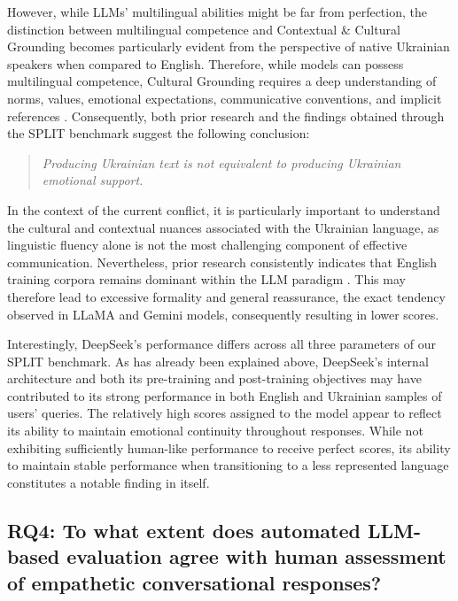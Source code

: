 \documentclass[10pt, twocolumn]{article}
\begin{document}
However, while LLMs' multilingual abilities might be far from perfection, the distinction between multilingual competence and Contextual \& Cultural Grounding becomes particularly evident from the perspective of native Ukrainian speakers when compared to English. Therefore, while models can possess multilingual competence, Cultural Grounding requires a deep understanding of norms, values, emotional expectations, communicative conventions, and implicit references \cite{rystrom2025multilingual}. Consequently, both prior research and the findings obtained through the SPLIT benchmark suggest the following conclusion:

\begin{quote}
    \centering
    \textit{Producing Ukrainian text is not equivalent to producing Ukrainian emotional support.}
\end{quote}

In the context of the current conflict, it is particularly important to understand the cultural and contextual nuances associated with the Ukrainian language, as linguistic fluency alone is not the most challenging component of effective communication. Nevertheless, prior research consistently indicates that English training corpora remains  dominant within the LLM paradigm \cite{grattafiori2024llama3herdmodels,
deepseekai2025deepseekv3technicalreport}. This  may therefore lead to excessive formality and general reassurance, the exact tendency observed in LLaMA and Gemini models, consequently resulting in lower scores.

Interestingly, DeepSeek's performance differs across all three parameters of our SPLIT benchmark. As has already been explained above, DeepSeek's internal architecture and both its pre-training and post-training objectives may have contributed to its strong performance in both English and Ukrainian samples of users' queries. The relatively high scores assigned to the model appear to reflect its ability to maintain emotional continuity throughout responses. While not exhibiting sufficiently human-like performance to receive perfect scores, its ability to maintain stable performance when transitioning to a less represented language constitutes a notable finding in itself.



\subsection{RQ4: To what extent does automated LLM-based evaluation agree with human assessment of empathetic conversational responses?}
\end{document}
